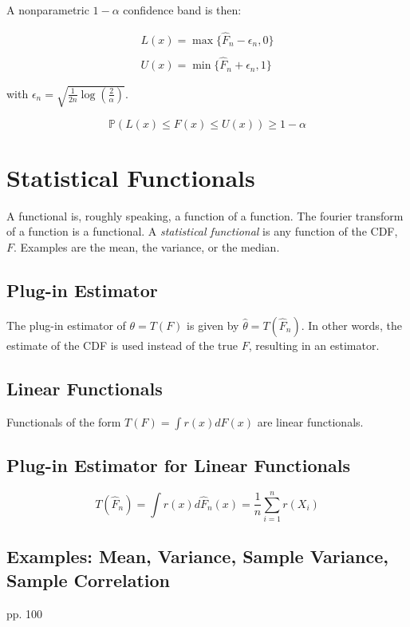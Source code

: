 A nonparametric $1-\alpha$ confidence band is then:

\begin{equation}
\begin{array}{c}
L(x) = \max\{\hat{F}_n -\epsilon_n, 0 \}\\
\\
U(x) = \min\{\hat{F}_n + \epsilon_n, 1\}
\end{array}
\end{equation}

with $\epsilon_n = \sqrt{\frac{1}{2n}\log\left(\frac{2}{\alpha}\right)}$.

\begin{equation}
\mathbb{P}\left(L(x) \leq F(x) \leq U(x) \right) \geq 1-\alpha
\end{equation}
	


\section{Statistical Functionals}
A functional is, roughly speaking, a function of a function. The fourier transform of a function is a functional. A \textit{statistical functional} is any function of the CDF, $F$. Examples are the mean, the variance, or the median. 

\subsection{Plug-in Estimator}
The plug-in estimator of $\theta = T(F)$ is given by $\hat{\theta} = T(\hat{F}_n)$. In other words, the estimate of the CDF is used instead of the true $F$, resulting in an estimator.

\subsection{Linear Functionals}
Functionals of the form $T(F) = \int r(x) dF(x)$ are linear functionals.  

\subsection{Plug-in Estimator for Linear Functionals}
\begin{equation}
T(\hat{F}_n) = \int r(x) d\hat{F}_n(x) = \frac{1}{n}\sum^{n}_{i=1}r(X_i)
\end{equation}

\subsection{Examples: Mean, Variance, Sample Variance, Sample Correlation}
 pp. 100
